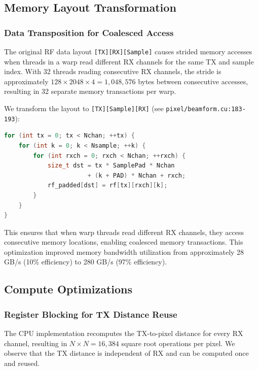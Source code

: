 \documentclass{article}
\begin{document}
\subsection{Memory Layout Transformation}

\subsubsection{Data Transposition for Coalesced Access}

The original RF data layout \texttt{[TX][RX][Sample]} causes strided memory accesses when threads in a warp read different RX channels for the same TX and sample index. With 32 threads reading consecutive RX channels, the stride is approximately $128 \times 2048 \times 4 = 1,048,576$ bytes between consecutive accesses, resulting in 32 separate memory transactions per warp.

We transform the layout to \texttt{[TX][Sample][RX]} (see \texttt{pixel/beamform.cu:183-193}):

\begin{lstlisting}[language=C++]
for (int tx = 0; tx < Nchan; ++tx) {
    for (int k = 0; k < Nsample; ++k) {
        for (int rxch = 0; rxch < Nchan; ++rxch) {
            size_t dst = tx * SamplePad * Nchan
                       + (k + PAD) * Nchan + rxch;
            rf_padded[dst] = rf[tx][rxch][k];
        }
    }
}
\end{lstlisting}

This ensures that when warp threads read different RX channels, they access consecutive memory locations, enabling coalesced memory transactions. This optimization improved memory bandwidth utilization from approximately 28 GB/s (10\% efficiency) to 280 GB/s (97\% efficiency).

\subsection{Compute Optimizations}

\subsubsection{Register Blocking for TX Distance Reuse}

The CPU implementation recomputes the TX-to-pixel distance for every RX channel, resulting in $N \times N = 16,384$ square root operations per pixel. We observe that the TX distance is independent of RX and can be computed once and reused.
\end{document}
